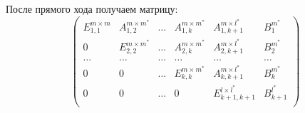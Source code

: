 \documentclass[12pt]{report}
\begin{document}
            После прямого хода получаем матрицу:
            \[
            \left(
            \begin{array}{ccccc|c}
                E_{1,1}^{m \times m} & A_{1,2}^{m \times m^*} & \ldots & A_{1,k}^{m \times m^*} & A_{1,k+1}^{m \times l^*}    & B^{m^*}_{1}   \\  
                0                    & E_{2,2}^{m \times m^*} & \ldots & A_{2,k}^{m \times m^*} & A_{2,k+1}^{m \times l^*}    & B^{m^*}_{2}   \\  
                \ldots               & \ldots                 & \ldots & \ldots                 & \ldots                      & \ldots        \\  
                0                    & 0                      & \ldots & E_{k,k}^{m \times m^*} & A_{k,k+1}^{m \times l^*}    & B^{m^*}_{k}   \\  
                0                    & 0                      & \ldots & 0                      & E_{k+1, k+1}^{l \times l^*} & B^{l^*}_{k+1} \\  
            \end{array} 
            \right)
            \]
\end{document}
